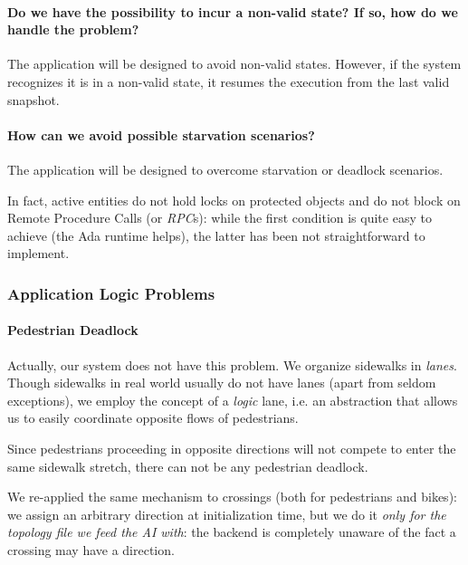\paragraph{Do we have the possibility to incur a non-valid state?
If so, how do we handle the problem?}
The application will be designed to avoid non-valid states.
However, if the system recognizes it is in a non-valid state, it resumes the
execution from the last valid snapshot.

\paragraph{How can we avoid possible starvation scenarios?}
The application will be designed to overcome starvation or deadlock scenarios.

In fact, active entities do not hold locks on protected objects and do not
block on Remote Procedure Calls (or \textit{RPC}s): while the first condition
is quite easy to achieve (the Ada runtime helps), the latter
has been not straightforward to implement.


\subsubsection{Application Logic Problems}

\paragraph{Pedestrian Deadlock}
Actually, our system does not have this problem. We organize sidewalks in
\textit{lanes}. Though sidewalks in real world usually do not have lanes (apart
from seldom exceptions), we employ the concept of a \textit{logic} lane, i.e.
an abstraction that allows us to easily
coordinate opposite flows of pedestrians.

Since pedestrians proceeding in opposite directions will not compete to enter
the same sidewalk stretch, there can not be any pedestrian deadlock.

We re-applied the same mechanism to crossings
(both for pedestrians and bikes): we
assign an arbitrary direction at initialization time, but we do it
\textit{only for the topology file we feed the AI with}: the backend is
completely unaware of the fact a crossing may have a direction.

